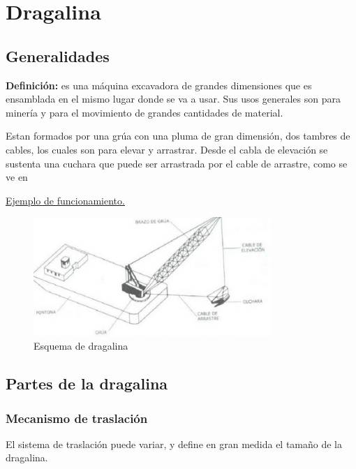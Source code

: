 \documentclass[a4paper]{article}
\begin{document}
\tableofcontents
\clearpage


\section{Dragalina}

\subsection{Generalidades}

\textbf{Definición:} es una máquina excavadora de grandes dimensiones que es 
ensamblada en el mismo lugar donde se va a usar. Sus usos generales son para 
minería y para el movimiento de grandes cantidades de material.

Estan formados por una grúa con una pluma de gran dimensión, dos tambres de cables,
los cuales son para elevar y arrastrar. Desde el cabla de elevación se sustenta
una cuchara que puede ser arrastrada por el cable de arrastre, como se ve en 

\href{https://www.youtube.com/watch?v=V4TK7boaxXM&t=8s}{Ejemplo de funcionamiento.}

\begin{figure}[ht]
  \centering
  \includegraphics[width=0.8\textwidth]{../images/apuntes-presentacion-20210429/esquema_dragalina}
  \caption{Esquema de dragalina}
  \label{fig:esquema_dragalina}
\end{figure}

\subsection{Partes de la dragalina}

\subsubsection{Mecanismo de traslación}

El sistema de traslación puede variar, y define en gran medida el tamaño de la
dragalina.
\end{document}
